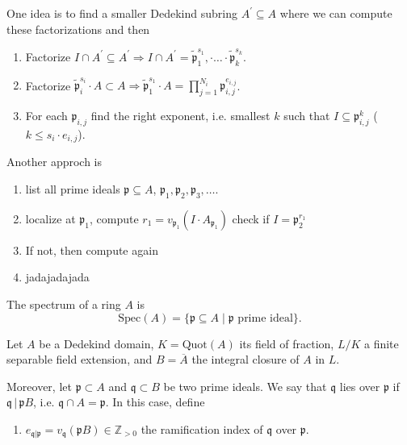 \documentclass[a4paper]{book}
\theoremstyle{break}
\theoremstyle{plain}
\begin{document}
One idea is to find a smaller Dedekind subring \(A^\prime \subseteq A\) where we can compute these factorizations and then

\begin{enumerate}
    \item Factorize \(I \cap A^\prime \subseteq A^\prime \Rightarrow I \cap A^\prime = \tilde{\mathfrak{p}}_1^{s_1}, \cdot \ldots \cdot \tilde{\mathfrak{p}}_k^{s_k}\).
    \item Factorize \(\tilde{\mathfrak{p}}_i^{s_i} \cdot A \subset A \Rightarrow \tilde{\mathfrak{p}}_1^{s_1} \cdot A = \prod_{j=1}^{N_i} \mathfrak{p}_{i, j}^{e_{i, j}}\).
    \item For each \(\mathfrak{p}_{i, j}\) find the right exponent, i.e. smallest \(k\) such that \(I \subseteq \mathfrak{p}_{i, j}^k\) (\(k \leq s_i \cdot e_{i, j}\)).
\end{enumerate}

Another approch is

\begin{enumerate}
    \item list all prime ideals \(\mathfrak{p} \subseteq A\), \(\mathfrak{p}_1, \mathfrak{p}_2, \mathfrak{p}_3, \ldots\).
    \item localize at \(\mathfrak{p}_1\), compute \(r_1 = v_{\mathfrak{p}_1} (I \cdot A_{\mathfrak{p}_1})\) check if \(I = \mathfrak{p}_2^{r_1}\)
    \item If not, then compute again
    \item jadajadajada
\end{enumerate}

\begin{definition}
    The spectrum of a ring \(A\) is
    \begin{equation}
        \text{Spec}(A) = \{\mathfrak{p} \subseteq A \mid \mathfrak{p} \text{ prime ideal}\}.
    \end{equation}
\end{definition}

\newpage

\begin{definition}
    Let \(A\) be a {\color{mathif}Dedekind domain}, \(K = \text{Quot}(A)\) its {\color{mathif}field of fraction}, \(L / K\) a {\color{mathif}finite separable field extension}, and \(B = \overline{A}\) the {\color{mathif}integral closure} of \(A\) in \(L\).
    
    Moreover, let \(\mathfrak{p} \subset A\) and \(\mathfrak{q} \subset B\) be two {\color{mathif}prime ideals}. We say that \(\mathfrak{q}\) {\color{mathrem}lies over} \(\mathfrak{p}\) if \(\mathfrak{q} \, | \, \mathfrak{p}B\), i.e. \(\mathfrak{q} \cap A = \mathfrak{p}\). In this case, define

    \begin{enumerate}
        \item \(e_{\mathfrak{q} | \mathfrak{p}} = v_\mathfrak{q}(\mathfrak{p}B) \in \mathbb{Z}_{>0}\) the {\color{maththen}ramification index} of \(\mathfrak{q}\) over \(\mathfrak{p}\).
    \end{enumerate}
\end{definition}
\end{document}
